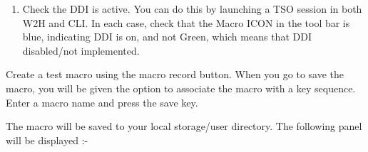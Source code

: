 \documentclass[letterpaper,10pt,english]{sphinxmanual}
\begin{document}
\begin{sphinxVerbatim}[commandchars=\\\{\}]
   
    
   
     
   
\end{sphinxVerbatim}
\begin{enumerate}
\def\theenumi{\arabic{enumi}}
\def\labelenumi{\theenumi .}
\makeatletter\def\p@enumii{\p@enumi \theenumi .}\makeatother
\setcounter{enumi}{5}
\item {} 
Check the DDI is active. You can do this by launching a TSO session in both W2H and CLI. In each case, check that the Macro ICON in the tool bar is blue, indicating DDI is on, and not Green, which means that DDI disabled/not implemented.

\end{enumerate}


Create a test macro using the macro record button. When you go to save the macro, you will be given the option to associate the macro with a key sequence. Enter a macro name and press the save key.


The macro will be saved to your local storage/user directory. The following panel will be displayed :-

\end{document}
